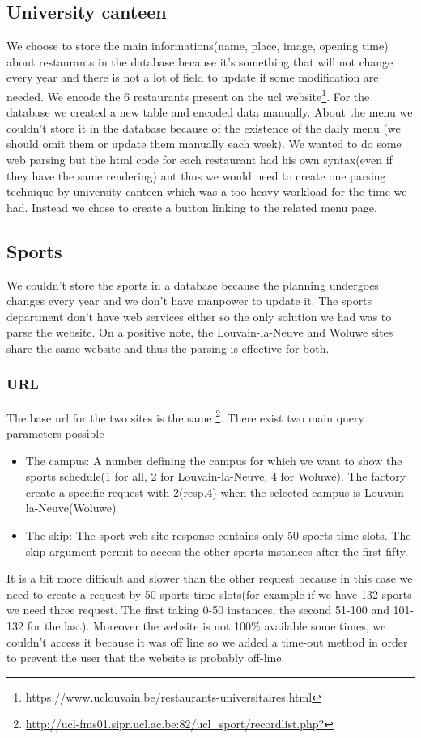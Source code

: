 \documentclass[11pt, a4paper]{report}
\begin{document}
\subsection{University canteen}
We choose to store the main informations(name, place, image, opening time) about restaurants in the database because it's  something that will not change every year and there is not a lot of field to update if some modification are needed. We encode the 6 restaurants present on the ucl website\footnote{https://www.uclouvain.be/restaurants-universitaires.html}. For the database we created a new table and encoded data manually. About the menu we couldn't store it in the database because of the existence of the daily menu (we should omit them or update them manually each week). We wanted to do some web parsing but the html code for each restaurant had his own syntax(even if they have the same rendering) ant thus we would need to create one parsing technique by university canteen which was a too heavy workload for the time we had. Instead we chose to create a button linking to the related menu page.
\subsection{Sports}
We couldn't store the sports in a database because the planning undergoes changes every year and we don't have manpower to update it. The sports department don't have web services either so the only solution we had was to parse the website. On a positive note, the Louvain-la-Neuve and Woluwe sites share the same website and thus the parsing is effective for both. 
\subsubsection{URL}
The base url for the two sites is the same \footnote{\url{http://ucl-fms01.sipr.ucl.ac.be:82/ucl_sport/recordlist.php?}}. There exist two main query parameters possible
\begin{itemize}
\item The campus: A number defining the campus for which we want to show the sports schedule(1 for all, 2 for Louvain-la-Neuve, 4 for Woluwe). The factory create a specific request with 2(resp.4) when the selected campus is Louvain-la-Neuve(Woluwe)
\item The skip: The sport web site response contains only 50 sports time slots. The skip argument permit to access the other sports instances after the first fifty.
\end{itemize}
It is a bit more difficult and slower than the other request because in this case we need to create a request by 50 sports time slots(for example if we have 132 sports we need three request. The first taking 0-50 instances, the second 51-100 and 101-132 for the last). Moreover the website is not 100\% available some times, we couldn't access it because it was off line so we added a time-out method in order to prevent the user that the website is probably off-line.
\end{document}
